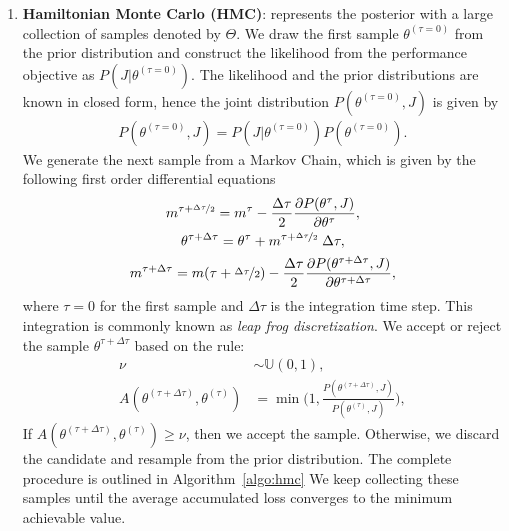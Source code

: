 \begin{enumerate}
    \item \textbf{Hamiltonian Monte Carlo (HMC)}: represents the posterior with
    a large collection of samples denoted by $\Theta$.
    We draw the first sample $\theta^{(\tau=0)}$ from the prior distribution and
    construct the likelihood from the performance objective as $P(J |
    \theta^{(\tau=0)})$.
    The likelihood and the prior distributions are known in closed form, hence
    the joint distribution $P(\theta^{(\tau=0)}, J)$ is given by
    \begin{align*}
        P(\theta^{(\tau=0)}, J) = P(J|\theta^{(\tau=0)})P(\theta^{(\tau=0)}).
    \end{align*}
    We generate the next sample from a Markov Chain, which is given by the
    following first order differential equations~\cite{bishop2006pattern}
    \begin{equation}
        \begin{gathered}
            m^{\tau + \nicefrac{\Delta \tau}{2}} = m^{\tau} - \dfrac{\Delta \tau}{2} \dfrac{\partial P(\theta^{\tau}, J)}{\partial \theta^{\tau}}, \\
            \theta^{\tau + \Delta \tau} = \theta^{\tau} + m^{\tau + \nicefrac{\Delta \tau}{2}} \; \Delta \tau, \\
            m^{\tau + \Delta \tau} = m(\tau + \nicefrac{\Delta \tau}{2}) - \dfrac{\Delta \tau}{2}\dfrac{\partial P(\theta^{\tau + \Delta \tau}, J)}{\partial \theta^{\tau + \Delta \tau}},
        \end{gathered}
        \label{eq:leapfrog}
    \end{equation}
    \noindent where $\tau=0$ for the first sample and $\Delta \tau$ is the integration time step. 
    This integration is commonly known as \textit{leap frog discretization}.
    We accept or reject the sample $\theta^{\tau + \Delta \tau}$ based on the rule:
    \begin{align*}
        \nu &\sim \mathbb{U}(0, 1), \\
        A(\theta^{(\tau + \Delta \tau)}, \theta^{(\tau)}) &= \min \Biggl(1, \frac{P(\theta^{(\tau + \Delta \tau)}, J)}{P(\theta^{(\tau)}, J)} \Biggr),
    \end{align*} 
    If $A(\theta^{(\tau + \Delta \tau)}, \theta^{(\tau)}) \geq \nu$, then we accept the sample. 
    Otherwise, we discard the candidate and resample from the prior
    distribution.
    The complete procedure is outlined in Algorithm~\eqref{algo:hmc}
    We keep collecting these samples until the average accumulated loss
    converges to the minimum achievable value. 


\end{enumerate}
